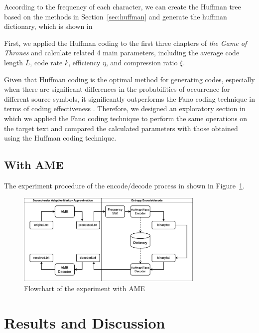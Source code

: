 \documentclass[12pt,twoside]{article}
\begin{document}
According to the frequency of each character, we can create the Huffman tree based on the methods in Section~\ref{sec:huffman} and generate the huffman dictionary, which is shown in 



First, we applied the Huffman coding to the first three chapters of \textit{the Game of Thrones} and calculate related 4 main parameters, including the average code length $\bar{L}$, code rate $k$, efficiency $\eta$, and compression ratio $\xi$.





Given that Huffman coding is the optimal method for generating codes, especially when there are significant differences in the probabilities of occurrence for different source symbols, it significantly outperforms the Fano coding technique in terms of coding effectiveness \cite{ref3, ref4}. Therefore, we designed an exploratory section in which we applied the Fano coding technique to perform the same operations on the target text and compared the calculated parameters with those obtained using the Huffman coding technique.

\subsection{With AME}

The experiment procedure of the encode/decode process in shown in Figure~\ref{fig:with-ame}.

\begin{figure}[h!]
    \centering
    \includegraphics[width=0.8\textwidth]{with-ame2.png}
    \caption{Flowchart of the experiment with AME}
    \label{fig:with-ame}
\end{figure}



\section{Results and Discussion}
\end{document}
